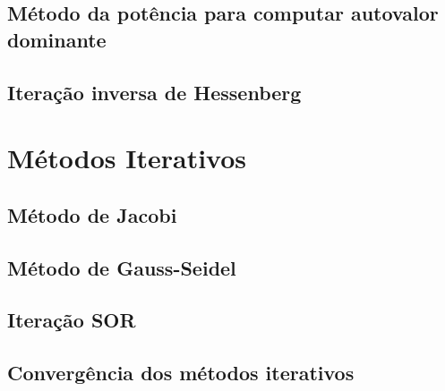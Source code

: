 \documentclass{article}
\begin{document}
\subsection{Método da potência para computar autovalor dominante}
\subsection{Iteração inversa de Hessenberg}

\section{Métodos Iterativos}
\subsection{Método de Jacobi}
\subsection{Método de Gauss-Seidel}
\subsection{Iteração SOR}
\subsection{Convergência dos métodos iterativos}
\end{document}
